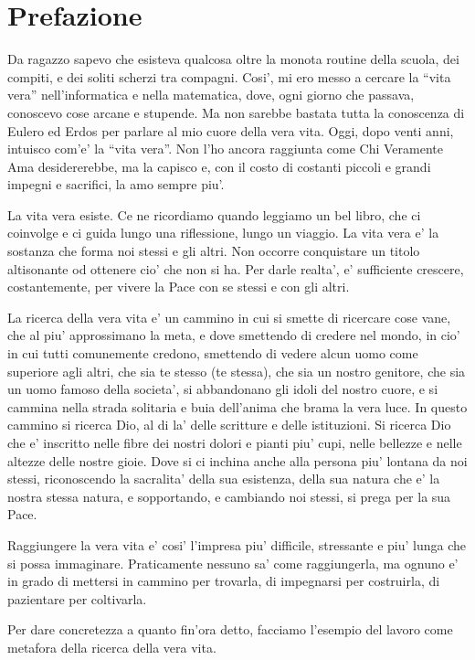 \chapter{Prefazione}
Da ragazzo sapevo che esisteva qualcosa oltre la monota routine della scuola, dei compiti, e dei soliti scherzi tra compagni. Cosi', mi ero messo a cercare la ``vita vera'' nell'informatica e nella matematica, dove, ogni giorno che passava, conoscevo cose arcane e stupende. Ma non sarebbe bastata tutta la conoscenza di Eulero ed Erdos per parlare al mio cuore della vera vita. Oggi, dopo venti anni, intuisco com'e' la ``vita vera''. Non l'ho ancora raggiunta come Chi Veramente Ama desidererebbe, ma la capisco e, con il costo di costanti piccoli e grandi impegni e sacrifici, la amo sempre piu'.

La vita vera esiste. Ce ne ricordiamo quando leggiamo un bel libro, che ci coinvolge e ci guida lungo una riflessione, lungo un viaggio.  La vita vera e' la sostanza che forma noi stessi e gli altri. Non occorre conquistare un titolo altisonante od ottenere cio' che non si ha. Per darle realta', e' sufficiente crescere, costantemente, per vivere la Pace con se stessi e con gli altri. 

La ricerca della vera vita e' un cammino in cui si smette di ricercare cose vane, che al piu' approssimano la meta, e dove smettendo di credere nel mondo, in cio' in cui tutti comunemente credono, smettendo di vedere alcun uomo come superiore agli altri, che sia te stesso (te stessa), che sia un nostro genitore, che sia un uomo famoso della societa', si abbandonano gli idoli del nostro cuore, e si cammina nella strada solitaria e buia dell'anima che brama la vera luce. In questo cammino si ricerca Dio, al di la' delle scritture e delle istituzioni. Si ricerca Dio che e' inscritto nelle fibre dei nostri dolori e pianti piu' cupi, nelle bellezze e nelle altezze delle nostre gioie. Dove si ci inchina anche alla persona piu' lontana da noi stessi, riconoscendo la sacralita' della sua esistenza, della sua natura che e' la nostra stessa natura, e sopportando, e cambiando noi stessi, si prega per la sua Pace.

Raggiungere la vera vita e' cosi' l'impresa piu' difficile, stressante e piu' lunga che si possa immaginare. Praticamente nessuno sa' come raggiungerla, ma ognuno e' in grado di mettersi in cammino per trovarla, di impegnarsi per costruirla, di pazientare per coltivarla.

Per dare concretezza a quanto fin'ora detto, facciamo l'esempio del lavoro come metafora della ricerca della vera vita.

